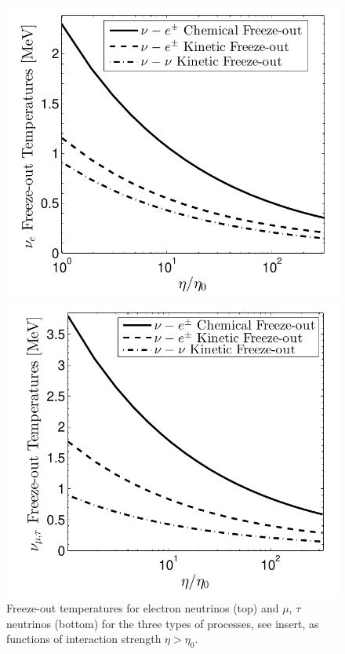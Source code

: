 \begin{figure}
\centerline{\includegraphics[width=0.82\linewidth]{04-birrell/ParametricStudies/Figures/nu_e_freezeout_GF.pdf}}
\centerline{\includegraphics[width=0.82\linewidth]{04-birrell/ParametricStudies/Figures/nu_mu_freezeout_GF.pdf}}
\caption{Freeze-out temperatures for electron neutrinos (top) and $\mu$, $\tau$ neutrinos (bottom) for the three types of processes, see insert, as functions of interaction strength $\eta>\eta_0$. }
\label{fig:freeze-outT_eta}
 \end{figure}


